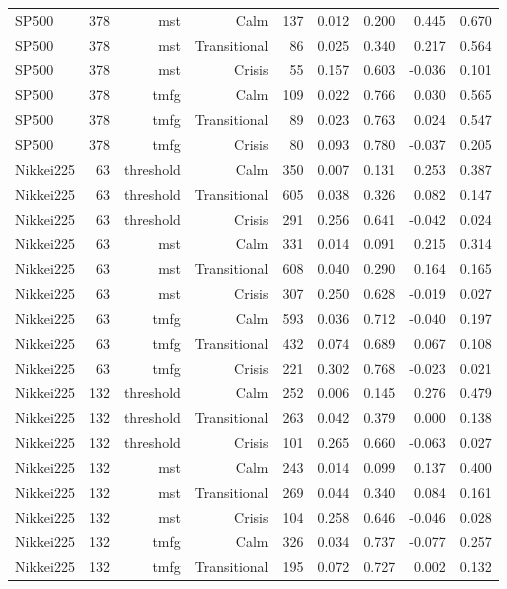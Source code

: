 \begin{tabular}{lrrrrrrrr}
SP500 & 378 & mst & Calm & 137 & 0.012 & 0.200 & 0.445 & 0.670 \\
SP500 & 378 & mst & Transitional & 86 & 0.025 & 0.340 & 0.217 & 0.564 \\
SP500 & 378 & mst & Crisis & 55 & 0.157 & 0.603 & -0.036 & 0.101 \\
SP500 & 378 & tmfg & Calm & 109 & 0.022 & 0.766 & 0.030 & 0.565 \\
SP500 & 378 & tmfg & Transitional & 89 & 0.023 & 0.763 & 0.024 & 0.547 \\
SP500 & 378 & tmfg & Crisis & 80 & 0.093 & 0.780 & -0.037 & 0.205 \\
Nikkei225 & 63 & threshold & Calm & 350 & 0.007 & 0.131 & 0.253 & 0.387 \\
Nikkei225 & 63 & threshold & Transitional & 605 & 0.038 & 0.326 & 0.082 & 0.147 \\
Nikkei225 & 63 & threshold & Crisis & 291 & 0.256 & 0.641 & -0.042 & 0.024 \\
Nikkei225 & 63 & mst & Calm & 331 & 0.014 & 0.091 & 0.215 & 0.314 \\
Nikkei225 & 63 & mst & Transitional & 608 & 0.040 & 0.290 & 0.164 & 0.165 \\
Nikkei225 & 63 & mst & Crisis & 307 & 0.250 & 0.628 & -0.019 & 0.027 \\
Nikkei225 & 63 & tmfg & Calm & 593 & 0.036 & 0.712 & -0.040 & 0.197 \\
Nikkei225 & 63 & tmfg & Transitional & 432 & 0.074 & 0.689 & 0.067 & 0.108 \\
Nikkei225 & 63 & tmfg & Crisis & 221 & 0.302 & 0.768 & -0.023 & 0.021 \\
Nikkei225 & 132 & threshold & Calm & 252 & 0.006 & 0.145 & 0.276 & 0.479 \\
Nikkei225 & 132 & threshold & Transitional & 263 & 0.042 & 0.379 & 0.000 & 0.138 \\
Nikkei225 & 132 & threshold & Crisis & 101 & 0.265 & 0.660 & -0.063 & 0.027 \\
Nikkei225 & 132 & mst & Calm & 243 & 0.014 & 0.099 & 0.137 & 0.400 \\
Nikkei225 & 132 & mst & Transitional & 269 & 0.044 & 0.340 & 0.084 & 0.161 \\
Nikkei225 & 132 & mst & Crisis & 104 & 0.258 & 0.646 & -0.046 & 0.028 \\
Nikkei225 & 132 & tmfg & Calm & 326 & 0.034 & 0.737 & -0.077 & 0.257 \\
Nikkei225 & 132 & tmfg & Transitional & 195 & 0.072 & 0.727 & 0.002 & 0.132 \\

\end{tabular}
